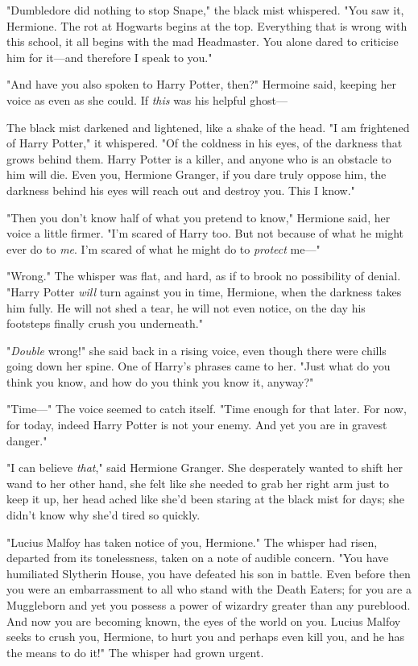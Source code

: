 "Dumbledore did nothing to stop Snape," the black mist whispered. "You saw it,
Hermione. The rot at Hogwarts begins at the top. Everything that is wrong with
this school, it all begins with the mad Headmaster. You alone dared to criticise
him for it---and therefore I speak to you."

"And have you also spoken to Harry Potter, then?" Hermoine said, keeping her
voice as even as she could. If \emph{this} was his helpful ghost---

The black mist darkened and lightened, like a shake of the head. "I am
frightened of Harry Potter," it whispered. "Of the coldness in his eyes, of the
darkness that grows behind them. Harry Potter is a killer, and anyone who is an
obstacle to him will die. Even you, Hermione Granger, if you dare truly oppose
him, the darkness behind his eyes will reach out and destroy you. This I know."

"Then you don't know half of what you pretend to know," Hermione said, her
voice a little firmer. "I'm scared of Harry too. But not because of what he
might ever do to \emph{me}. I'm scared of what he might do to \emph{protect}
me---"

"Wrong." The whisper was flat, and hard, as if to brook no possibility of
denial. "Harry Potter \emph{will} turn against you in time, Hermione, when the
darkness takes him fully. He will not shed a tear, he will not even notice, on
the day his footsteps finally crush you underneath."

"\emph{Double} wrong!" she said back in a rising voice, even though there were
chills going down her spine. One of Harry's phrases came to her. "Just what do
you think you know, and how do you think you know it, anyway?"

"Time---" The voice seemed to catch itself. "Time enough for that later. For
now, for today, indeed Harry Potter is not your enemy. And yet you are in
gravest danger."

"I can believe \emph{that}," said Hermione Granger. She desperately wanted to
shift her wand to her other hand, she felt like she needed to grab her right
arm just to keep it up, her head ached like she'd been staring at the black
mist for days; she didn't know why she'd tired so quickly.

"Lucius Malfoy has taken notice of you, Hermione." The whisper had risen,
departed from its tonelessness, taken on a note of audible concern. "You have
humiliated Slytherin House, you have defeated his son in battle. Even before
then you were an embarrassment to all who stand with the Death Eaters; for you
are a Muggleborn and yet you possess a power of wizardry greater than any
pureblood. And now you are becoming known, the eyes of the world on you. Lucius
Malfoy seeks to crush you, Hermione, to hurt you and perhaps even kill you, and
he has the means to do it!" The whisper had grown urgent.

